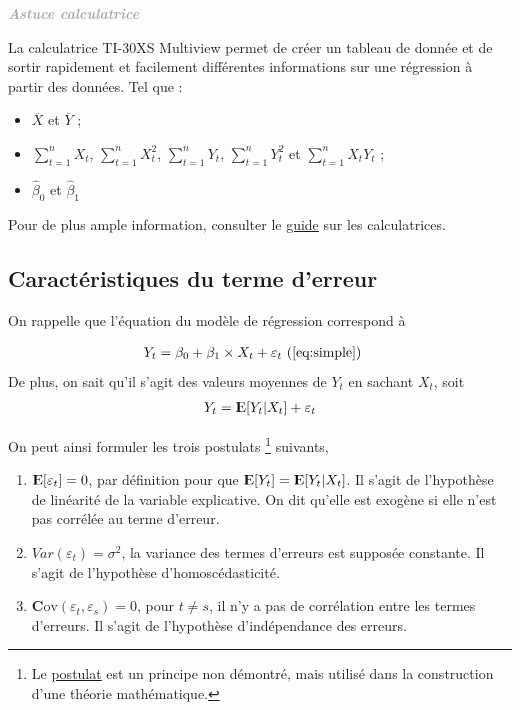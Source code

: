 \documentclass[11pt,french]{report}
\newcommand{\E}{{\rm I\kern-.3em E}}
\newcommand{\Cov}{\mathrm{\textbf{C}ov}}
\newenvironment{moreInfo}[1]
	{\begin{mdframed}
	\textcolor{darkgray}{\huge \raisebox{-3.5pt}{\faInfo} 
	\hspace{0.5cm} \large\bfseries #1}\\[5pt]
	\normalsize
	\makebox[0.1\textwidth][l]{}	
	\begin{minipage}{10cm}}
	{	\end{minipage}
	\end{mdframed}}
\begin{document}
\bigskip
\begin{moreInfo}{\color{Gray}\emph{Astuce calculatrice}}
     \color{black}
	La calculatrice TI-30XS Multiview permet de créer un tableau de donnée et de sortir rapidement et facilement différentes informations sur une régression à partir des données. Tel que :
	\begin{itemize}
	\item $\overline{X}$ et $\overline{Y}$ ;
	\item $\displaystyle\sum_{t=1}^n X_t$, $\displaystyle\sum_{t=1}^n X_t^2$, $\displaystyle\sum_{t=1}^n Y_t$, $\displaystyle\sum_{t=1}^n Y_t^2$ et $\displaystyle\sum_{t=1}^n X_tY_t$ ;
	\item $\hat{\beta}_0$ et $\hat{\beta}_1$
	\end{itemize}
	Pour de plus ample information, consulter le \href{https://github.com/alpa12/guide_calculatrice}{guide} sur les calculatrices.
\end{moreInfo}
\bigskip

\subsection{Caractéristiques du terme d'erreur}
On rappelle que l'équation du modèle de régression correspond à 

\begin{align*}
Y_t &= \beta_0 + \beta_1\times X_t + \varepsilon_t \text{ (\ref{eq:simple})}
\end{align*}
De plus, on sait qu'il s'agit des valeurs moyennes de $Y_t$ en sachant $X_t$, soit
\begin{align*}
Y_t = \E[Y_t|X_t] + \varepsilon_t 
\end{align*}

On peut ainsi formuler les trois postulats \footnote{Le \href{https://fr.wikipedia.org/wiki/Postulat}{postulat} est un principe non démontré, mais utilisé dans la construction d'une théorie mathématique. } suivants,
\begin{enumerate}
\item \label{post1} $\E[\varepsilon_t] = 0$, par définition pour que $\E[Y_t] = \E[Y_t|X_t]$. Il s'agit de l'hypothèse de linéarité de la variable explicative. On dit qu'elle est exogène si elle n'est pas corrélée au terme d'erreur.
\item \label{post2} $Var(\varepsilon_t) = \sigma^2$, la variance des termes d'erreurs est supposée constante. Il s'agit de l'hypothèse d'homoscédasticité.
\item \label{post3} $\Cov(\varepsilon_t, \varepsilon_s) = 0$, pour $t \neq s$, il n'y a pas de corrélation entre les termes d'erreurs. Il s'agit de l'hypothèse d'indépendance des erreurs.
\end{enumerate}
\end{document}
